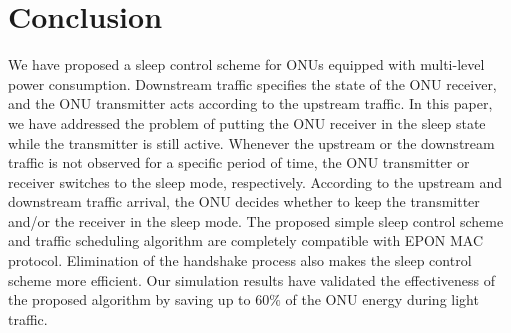\documentclass[11pt,english,12pt,onecolumn, draftcls]{IEEEtran}
\theoremstyle{plain}
\theoremstyle{definition}
\begin{document}
\section{Conclusion}
\label{sec:Con}
We have proposed a sleep control scheme for ONUs equipped with multi-level power consumption.  Downstream traffic specifies the state of the ONU receiver, and the ONU transmitter acts according to the upstream traffic. In this paper, we have addressed the problem of putting the ONU receiver in the sleep state while the transmitter is still active. Whenever the upstream or the downstream traffic is not observed for a specific period of time, the ONU transmitter or receiver switches to the sleep mode, respectively. According to the upstream and downstream traffic arrival, the ONU decides whether to keep the transmitter and/or the receiver in the sleep mode. The proposed simple sleep control scheme and traffic scheduling algorithm are completely compatible with EPON MAC protocol. Elimination of the handshake process also makes the sleep control scheme more efficient. Our simulation results have validated the effectiveness of the proposed algorithm by saving up to $60\%$ of the ONU energy during light traffic.



\end{document}
